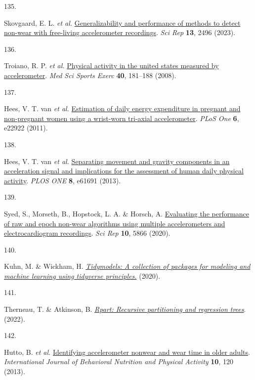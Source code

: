 \documentclass[
  10pt,
]{scrbook}
\newlength{\cslhangindent}
\newlength{\csllabelwidth}
\newlength{\cslentryspacingunit} %
\newenvironment{CSLReferences}[2] %
 {%
  \setlength{\parindent}{0pt}
  \ifodd #1
  \let\oldpar\par
  \def\par{\hangindent=\cslhangindent\oldpar}
  \fi
  \setlength{\parskip}{#2\cslentryspacingunit}
 }%
 {}
\newcommand{\CSLLeftMargin}[1]{\parbox[t]{\csllabelwidth}{#1}}
\newcommand{\CSLRightInline}[1]{\parbox[t]{\linewidth - \csllabelwidth}{#1}\break}
\let\originaltextbf\textbf
\renewcommand{\textbf}[1]{\textcolor{color1}{\textsf{\originaltextbf{#1}}}}
\begin{document}
\begin{CSLReferences}{0}{0}
\leavevmode{}%
\CSLLeftMargin{135. }%
\CSLRightInline{Skovgaard, E. L. \emph{et al.}
\href{https://doi.org/10.1038/s41598-023-29666-x}{Generalizability and
performance of methods to detect non-wear with free-living accelerometer
recordings}. \emph{Sci Rep} \textbf{13}, 2496 (2023).}

\leavevmode{}%
\CSLLeftMargin{136. }%
\CSLRightInline{Troiano, R. P. \emph{et al.}
\href{https://doi.org/10.1249/mss.0b013e31815a51b3}{Physical activity in
the united states measured by accelerometer}. \emph{Med Sci Sports
Exerc} \textbf{40}, 181--188 (2008).}

\leavevmode{}%
\CSLLeftMargin{137. }%
\CSLRightInline{Hees, V. T. van \emph{et al.}
\href{https://doi.org/10.1371/journal.pone.0022922}{Estimation of daily
energy expenditure in pregnant and non-pregnant women using a wrist-worn
tri-axial accelerometer}. \emph{{PLoS} One} \textbf{6}, e22922 (2011).}

\leavevmode{}%
\CSLLeftMargin{138. }%
\CSLRightInline{Hees, V. T. van \emph{et al.}
\href{https://doi.org/10.1371/journal.pone.0061691}{Separating movement
and gravity components in an acceleration signal and implications for
the assessment of human daily physical activity}. \emph{{PLOS} {ONE}}
\textbf{8}, e61691 (2013).}

\leavevmode{}%
\CSLLeftMargin{139. }%
\CSLRightInline{Syed, S., Morseth, B., Hopstock, L. A. \& Horsch, A.
\href{https://doi.org/10.1038/s41598-020-62821-2}{Evaluating the
performance of raw and epoch non-wear algorithms using multiple
accelerometers and electrocardiogram recordings}. \emph{Sci Rep}
\textbf{10}, 5866 (2020).}

\leavevmode{}%
\CSLLeftMargin{140. }%
\CSLRightInline{Kuhn, M. \& Wickham, H.
\emph{\href{https://www.tidymodels.org}{Tidymodels: A collection of
packages for modeling and machine learning using tidyverse principles.}}
(2020).}

\leavevmode{}%
\CSLLeftMargin{141. }%
\CSLRightInline{Therneau, T. \& Atkinson, B.
\emph{\href{https://CRAN.R-project.org/package=rpart}{Rpart: Recursive
partitioning and regression trees}}. (2022).}

\leavevmode{}%
\CSLLeftMargin{142. }%
\CSLRightInline{Hutto, B. \emph{et al.}
\href{https://doi.org/10.1186/1479-5868-10-120}{Identifying
accelerometer nonwear and wear time in older adults}.
\emph{International Journal of Behavioral Nutrition and Physical
Activity} \textbf{10}, 120 (2013).}


\end{CSLReferences}
\end{document}
